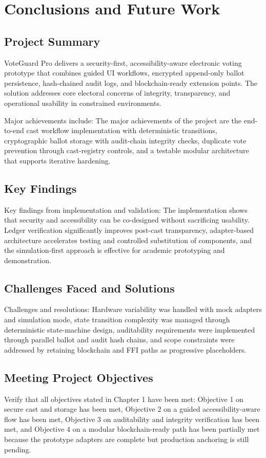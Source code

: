 \chapter{Conclusions and Future Work}

\section{Project Summary}
VoteGuard Pro delivers a security-first, accessibility-aware electronic voting prototype that combines guided UI workflows, encrypted append-only ballot persistence, hash-chained audit logs, and blockchain-ready extension points. The solution addresses core electoral concerns of integrity, transparency, and operational usability in constrained environments.

Major achievements include:
The major achievements of the project are the end-to-end cast workflow implementation with deterministic transitions, cryptographic ballot storage with audit-chain integrity checks, duplicate vote prevention through cast-registry controls, and a testable modular architecture that supports iterative hardening.

\section{Key Findings}
Key findings from implementation and validation:
The implementation shows that security and accessibility can be co-designed without sacrificing usability. Ledger verification significantly improves post-cast transparency, adapter-based architecture accelerates testing and controlled substitution of components, and the simulation-first approach is effective for academic prototyping and demonstration.

\section{Challenges Faced and Solutions}
Challenges and resolutions:
Hardware variability was handled with mock adapters and simulation mode, state transition complexity was managed through deterministic state-machine design, auditability requirements were implemented through parallel ballot and audit hash chains, and scope constraints were addressed by retaining blockchain and FFI paths as progressive placeholders.

\section{Meeting Project Objectives}
Verify that all objectives stated in Chapter 1 have been met:
Objective 1 on secure cast and storage has been met, Objective 2 on a guided accessibility-aware flow has been met, Objective 3 on auditability and integrity verification has been met, and Objective 4 on a modular blockchain-ready path has been partially met because the prototype adapters are complete but production anchoring is still pending.

